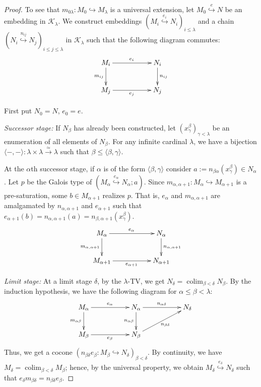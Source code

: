 \documentclass[10pt]{amsart}
\numberwithin{equation}{section}
\theoremstyle{plain}
\theoremstyle{definition}
\DeclareMathOperator*{\colim}{colim}
\newcommand{\K}{\mathcal{K}}
\newcommand{\pair}[1]{\langle #1 \rangle}
\newcommand{\embed}{\hookrightarrow}
\newcommand{\edge}[1]{\overset{#1}{\longrightarrow}}
\newcommand{\embedge}[1]{\overset{#1}{\embed}}
\begin{document}
\begin{proof}
To see that $m_{0\lambda}\colon M_0\embed M_\lambda$ is a universal extension, let $M_0\embedge{e} N$ be an embedding in $\K_\lambda$.
We construct embeddings $(M_i\embedge{e_i}N_i)_{i\leq\lambda}$ and a chain $(N_i\embedge{n_{ij}}N_j)_{i\leq j\leq\lambda}$ in $\K_\lambda$ such that the following diagram commutes:
\[
\xymatrix{
	M_i\ar[rr]^{e_i}\ar[d]_{m_{ij}} & & N_i \ar[d]^{n_{ij}}\\
	M_j\ar[rr]_{e_j} & & N_j
}
\]

First put $N_0=N$, $e_0=e$.

\medskip
\noindent
{\it Successor stage:}
If $N_\beta$ has already been constructed, let $(x^\beta_\gamma)_{\gamma<\lambda}$ be an enumeration of all elements of $N_\beta$.
For any infinite cardinal $\lambda$, we have a bijection $\pair{-,-}\colon\lambda\times\lambda\edge{\simeq}\lambda$ such that $\beta\leq \langle \beta,\gamma\rangle$.

At the $\alpha$th successor stage, if $\alpha$ is of the form $\pair{\beta,\gamma}$ consider $a:=n_{\beta\alpha}(x^\beta_\gamma)\in N_\alpha$.
Let $p$ be the Galois type of $(M_\alpha\embedge{e_\alpha}N_\alpha;a)$.
Since $m_{\alpha,\alpha+1}\colon M_\alpha\embed M_{\alpha+1}$ is a pre-saturation, some $b\in M_{\alpha+1}$ realizes $p$.
That is, $e_\alpha$ and $m_{\alpha,\alpha+1}$ are amalgamated by $n_{\alpha,\alpha+1}$ and $e_{\alpha+1}$ such that $e_{\alpha+1}(b)=n_{\alpha,\alpha+1}(a)=n_{\beta,\alpha+1}(x^\beta_\gamma)$.
\[
\xymatrix{
	M_\alpha\ar[rr]^{e_\alpha}\ar[d]_{m_{\alpha,\alpha+1}} & & N_\alpha \ar[d]^{n_{\alpha,\alpha+1}}\\
	M_{\alpha+1}\ar[rr]_{e_{\alpha+1}} & & N_{\alpha+1}
}
\]

\noindent
{\it Limit stage:}
At a limit stage $\delta$, by the $\lambda$-TV, we get $N_\delta=\colim_{\beta<\delta}N_\beta$.
By the induction hypothesis, we have the following diagram for $\alpha\leq \beta<\lambda$:
\[
\xymatrix{
	M_\alpha\ar[rr]^{e_\alpha}\ar[d]_{m_{\alpha\beta}} & & N_\alpha \ar[d]_{n_{\alpha\beta}} \ar[rr]^{n_{\alpha\delta}} & & N_\delta\\
	M_\beta\ar[rr]_{e_\beta} & & N_\beta \ar[rru]_{n_{\beta\delta}} & &
}
\]
Thus, we get a cocone $(n_{\beta\delta}e_\beta\colon M_\beta\embed N_\delta)_{\beta<\delta}$.
By continuity, we have $M_\delta=\colim_{\beta<\delta}M_\beta$; hence, by the universal property, we obtain $M_\delta\embedge{e_\delta}N_\delta$ such that $e_\delta m_{\beta\delta}=n_{\beta\delta}e_\beta$.


\end{proof}
\end{document}
